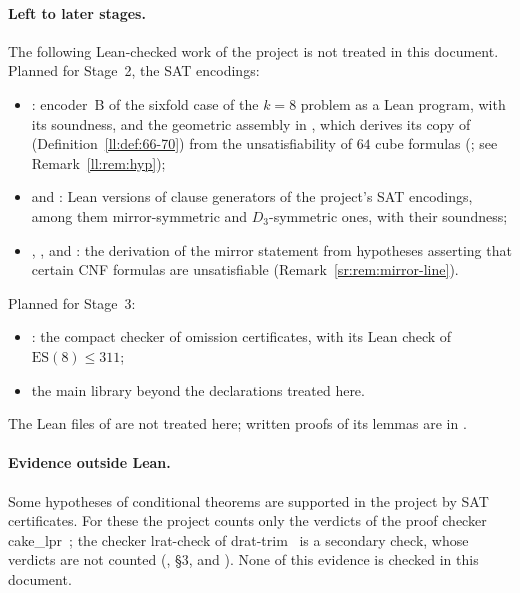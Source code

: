 \documentclass[10pt]{amsart}
\begin{document}
\paragraph{Left to later stages.}
The following Lean-checked work of the project is not treated in this document. Planned for Stage~2, the SAT
encodings:
\begin{itemize}
\item {}: encoder~B of the sixfold case of the $k=8$ problem as a Lean program, with its soundness, and
  the geometric assembly in , which derives its copy of 
  (Definition~\ref{ll:def:66-70}) from the unsatisfiability of $64$ cube formulas
  (; see Remark~\ref{ll:rem:hyp});
\item {} and : Lean versions of clause generators of the project's SAT encodings, among them
  mirror-symmetric and $D_3$-symmetric ones, with their soundness;
\item {}, ,  and : the derivation of the mirror statement
   from hypotheses asserting that certain CNF formulas are unsatisfiable
  (Remark~\ref{sr:rem:mirror-line}).
\end{itemize}
Planned for Stage~3:
\begin{itemize}
\item {}: the compact checker of omission certificates, with its
  Lean check of $\mathrm{ES}(8)\le311$;
\item the main library beyond the declarations treated here.
\end{itemize}
The Lean files of  are not treated here; written proofs of its lemmas are in
.

\paragraph{Evidence outside Lean.}
Some hypotheses of conditional theorems are supported in the project by SAT certificates. For these the project
counts only the verdicts of the proof checker cake\_lpr~\cite{CakeLPR}; the checker lrat-check of
drat-trim~\cite{DT} is a secondary check, whose verdicts are not counted (, \S3, and
). None of this evidence is checked in this document.
\end{document}
